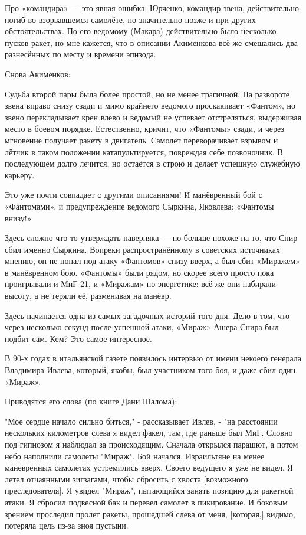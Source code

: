 Про «командира» — это явная ошибка. Юрченко, командир звена, действительно погиб во взорвавшемся самолёте, но значительно позже и при других обстоятельствах. По его ведомому (Макара) действительно было несколько пусков ракет, но мне кажется, что в описании Акименкова всё же смешались два разнесённых по месту и времени эпизода.

Снова Акименков:

\begin{textcitation}
	Судьба второй пары была более простой, но не менее трагичной. На развороте звена вправо снизу сзади и мимо крайнего ведомого проскакивает «Фантом», но звено перекладывает крен влево и ведомый не успевает отстреляться, выдерживая место в боевом порядке. Естественно, кричит, что «Фантомы» сзади, и через мгновение получает ракету в двигатель. Самолёт переворачивает взрывом и лётчик в таком положении катапультируется, повреждая себе позвоночник. В последующем долго лечится, но остаётся в строю и делает успешную служебную карьеру.
\end{textcitation}


Это уже почти совпадает с другими описаниями! И манёвренный бой с «Фантомами», и предупреждение ведомого Сыркина, Яковлева: «Фантомы внизу!»

Здесь сложно что-то утверждать наверняка — но больше похоже на то, что Снир сбил именно Сыркина. Вопреки распространённому в советских источниках мнению, он не попал под атаку «Фантомов» снизу-вверх, а был сбит «Миражем» в манёвренном бою. «Фантомы» были рядом, но скорее всего просто пока проигрывали и МиГ-21, и «Миражам» по энергетике: всё же они набирали высоту, а не теряли её, разменивая на манёвр.

Здесь начинается одна из самых загадочных историй того дня. Дело в том, что через несколько секунд после успешной атаки, «Мираж» Ашера Снира был подбит сам. Кем? Это самое интересное.

В 90-х годах в итальянской газете появилось интервью от имени некоего генерала Владимира Ивлева, который, якобы, был участником того боя, и даже сбил один «Мираж».

Приводятся его слова (по книге Дани Шалома):

\begin{textcitation}
	"Мое сердце начало сильно биться," - рассказывает Ивлев, - "на расстоянии нескольких километров слева я видел факел, там, где раньше был МиГ. Словно под гипнозом я наблюдал за происходящим. Сначала открылся парашют, а потом небо наполнили самолеты "Мираж". Бой начался. Израильтяне на менее маневренных самолетах устремились вверх. Своего ведущего я уже не видел. Я летел отчаянными зигзагами, чтобы сбросить с хвоста [возможного преследователя]. Я увидел "Мираж", пытающийся занять позицию для ракетной атаки. Я сбросил подвесной бак и перевел самолет в пикирование. И боковым зрением проследил пролет ракеты, прошедшей слева от меня, [которая,] видимо, потеряла цель из-за зноя пустыни.
\end{textcitation}

